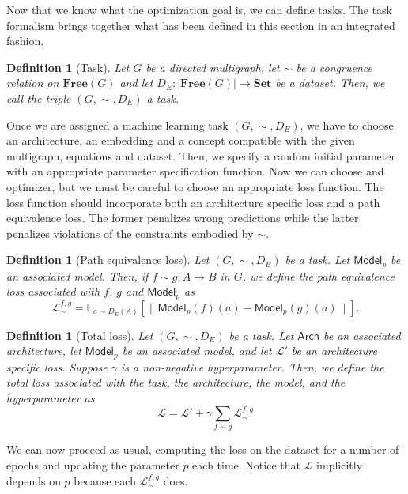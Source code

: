 \documentclass[11pt,a4paper,openright,twoside]{report}
\newcounter{mycounter}
\theoremstyle{plain}
\newtheorem{definition}[mycounter]{Definition}
\theoremstyle{definition}
\begin{document}
Now that we know what the optimization goal is, we can define tasks. The task formalism brings together what has been defined in this section in an integrated fashion.

\begin{definition}[Task]
  Let $G$ be a directed multigraph, let ${\sim}$ be a congruence relation on $\mathbf{Free}(G)$ and let $D_E: |\mathbf{Free}(G)| \to \mathbf{Set}$ be a dataset. Then, we call the triple $(G,{\sim},D_E)$ a task.
\end{definition}

Once we are assigned a machine learning task $(G,{\sim},D_E)$, we have to choose an architecture, an embedding and a concept compatible with the given multigraph, equations and dataset. Then, we specify a random initial parameter with an appropriate parameter specification function. Now we can choose and optimizer, but we must be careful to choose an appropriate loss function. The loss function should incorporate both an architecture specific loss and a path equivalence loss. The former penalizes wrong predictions while the latter penalizes violations of the constraints embodied by ${\sim}$.

\begin{definition}[Path equivalence loss]
  Let $(G,{\sim},D_E)$ be a task. Let $\mathsf{Model}_p$ be an associated model. Then, if $f \sim g: A \to B$ in $G$, we define the path equivalence loss associated with $f$, $g$ and $\mathsf{Model}_p$ as 
  \[\mathcal{L}_{\sim}^{f,g} = \mathbb{E}_{a \sim D_E(A)}[\|\mathsf{Model}_p(f)(a) - \mathsf{Model}_p(g)(a)\|].\]  
\end{definition}

\begin{definition}[Total loss]
  Let $(G,{\sim},D_E)$ be a task. Let $\mathsf{Arch}$ be an associated architecture, let $\mathsf{Model}_p$ be an associated model, and let $\mathcal{L}'$ be an architecture specific loss. Suppose $\gamma$ is a non-negative hyperparameter. Then, we define the total loss associated with the task, the architecture, the model, and the hyperparameter as
  \begin{equation}
    \label{eq: sumoflosses}
    \mathcal{L} = \mathcal{L}' + \gamma\sum_{f \sim g}\mathcal{L}_{\sim}^{f,g}
  \end{equation}
\end{definition}

We can now proceed as usual, computing the loss on the dataset for a number of epochs and updating the parameter $p$ each time. Notice that $\mathcal{L}$ implicitly depends on $p$ because each $\mathcal{L}_{\sim}^{f,g}$ does.
\end{document}
